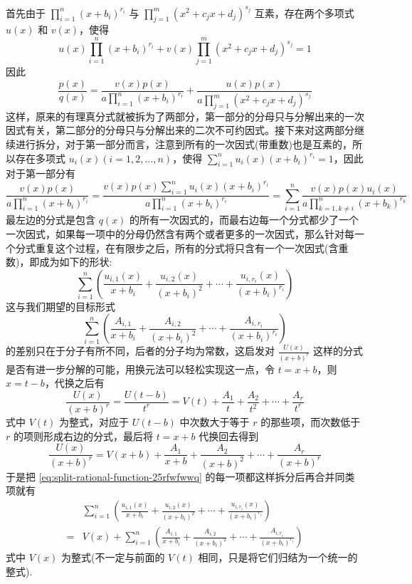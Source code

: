 首先由于 $\prod_{i=1}^n(x+b_i)^{r_i}$ 与  $\prod_{j=1}^m(x^2+c_j x + d_j)^{s_j}$ 互素，存在两个多项式 $u(x)$ 和 $v(x)$，使得
\[ u(x) \prod_{i=1}^n(x+b_i)^{r_i} + v(x) \prod_{j=1}^m(x^2+c_j x + d_j)^{s_j} = 1 \]
因此
\[ \frac{p(x)}{q(x)} = \frac{v(x)p(x)}{a \prod_{i=1}^n(x+b_i)^{r_i}} + \frac{u(x)p(x)}{a \prod_{j=1}^m(x^2+c_j x + d_j)^{s_j}} \]
这样，原来的有理真分式就被拆为了两部分，第一部分的分母只与分解出来的一次因式有关，第二部分的分母只与分解出来的二次不可约因式。接下来对这两部分继续进行拆分，对于第一部分而言，注意到所有的一次因式(带重数)也是互素的，所以存在多项式 $u_i(x)(i=1,2,\ldots,n)$，使得 $\sum_{i=1}^{n}u_i(x)(x+b_i)^{r_i}=1$，因此对于第一部分有
\[ \frac{v(x)p(x)}{a \prod_{i=1}^n(x+b_i)^{r_i}} = \frac{v(x)p(x)\sum_{i=1}^{n}u_i(x)(x+b_i)^{r_i}}{a \prod_{i=1}^n(x+b_i)^{r_i}} = \sum_{i=1}^{n} \frac{v(x)p(x)u_i(x)}{a \prod_{k=1,k \neq i}^n(x+b_k)^{r_k}}  \]
最左边的分式是包含 $q(x)$ 的所有一次因式的，而最右边每一个分式都少了一个一次因式，如果每一项中的分母仍然含有两个或者更多的一次因式，那么针对每一个分式重复这个过程，在有限步之后，所有的分式将只含有一个一次因式(含重数)，即成为如下的形状:
\begin{equation}
    \label{eq:split-rational-function-25rfwfwwq}
\sum_{i=1}^{n} \left( \frac{u_{i,1}(x)}{x+b_i} + \frac{u_{i,2}(x)}{(x+b_i)^2} + \cdots + \frac{u_{i,r_i}(x)}{(x+b_i)^{r_i}}  \right) 
\end{equation}
这与我们期望的目标形式
\[  \sum_{i=1}^{n} \left( \frac{A_{i,1}}{x+b_i} + \frac{A_{i,2}}{(x+b_i)^2} + \cdots + \frac{A_{i,r_i}}{(x+b_i)^{r_i}}  \right) \]
的差别只在于分子有所不同，后者的分子均为常数，这启发对
$ \frac{U(x)}{(x+b)^r} $
这样的分式是否有进一步分解的可能，用换元法可以轻松实现这一点，令 $t=x+b$，则 $x=t-b$，代换之后有
\[ \frac{U(x)}{(x+b)^r} = \frac{U(t-b)}{t^r} = V(t) + \frac{A_1}{t} + \frac{A_2}{t^2} + \cdots + \frac{A_r}{t^r} \]
式中 $V(t)$ 为整式，对应于 $U(t-b)$ 中次数大于等于 $r$ 的那些项，而次数低于 $r$ 的项则形成右边的分式，最后将 $t=x+b$ 代换回去得到
\[ \frac{U(x)}{(x+b)^r} = V(x+b) + \frac{A_1}{x+b} + \frac{A_2}{(x+b)^2} + \cdots + \frac{A_r}{(x+b)^{r}} \]
于是把 \autoref{eq:split-rational-function-25rfwfwwq} 的每一项都这样拆分后再合并同类项就有
\begin{align*}
 &\sum_{i=1}^{n} \left( \frac{u_{i,1}(x)}{x+b_i} + \frac{u_{i,2}(x)}{(x+b_i)^2} + \cdots + \frac{u_{i,r_i}(x)}{(x+b_i)^{r_i}}  \right) \\
 = & V(x) + \sum_{i=1}^{n} \left( \frac{A_{i,1}}{x+b_i} + \frac{A_{i,2}}{(x+b_i)^2} + \cdots + \frac{A_{i,r_i}}{(x+b_i)^{r_i}}  \right)
\end{align*}
式中 $V(x)$ 为整式(不一定与前面的 $V(t)$ 相同，只是将它们归结为一个统一的整式).




